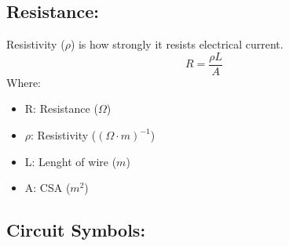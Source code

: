 \documentclass[a5paper]{article}
\begin{document}
	\subsection{Resistance:}
	Resistivity ($\rho$) is how strongly it resists electrical current.
	$$R=\frac{\rho L}{A}$$
	Where:
	\begin{itemize}
		\item R: Resistance ($\Omega$)
		\item $\rho$: Resistivity ($(\Omega\cdot m)^{-1}$)
		\item L: Lenght of wire ($m$)
		\item A: CSA ($m^{2}$)
	\end{itemize}
	\subsection{Circuit Symbols:}
\end{document}

